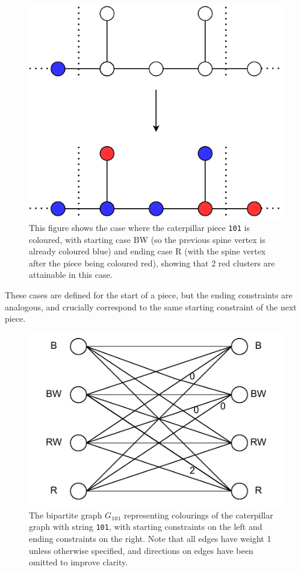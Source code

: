\documentclass{mpaper}
\begin{document}
\begin{figure}
    \centering
    \includegraphics[scale=0.75]{mpaper/figures/CaterpillarPieceColouring.pdf}
    \caption{This figure shows the case where the caterpillar piece \texttt{101} is coloured, with starting case BW (so the previous spine vertex is already coloured blue) and ending case R (with the spine vertex after the piece being coloured red), showing that 2 red clusters are attainable in this case.}
    \label{fig/caterpillar-piece-colouring}
\end{figure}

These cases are defined for the start of a piece, but the ending constraints are analogous, and crucially correspond to the same starting constraint of the next piece.

\begin{figure}
    \centering
    \includegraphics[scale=0.75]{mpaper/figures/ColouringGraph101.pdf}
    \caption{The bipartite graph $G_{\texttt{101}}$ representing colourings of the caterpillar graph with string \texttt{101}, with starting constraints on the left and ending constraints on the right. Note that all edges have weight 1 unless otherwise specified, and directions on edges have been omitted to improve clarity.}
    \label{fig/colouring_101}
\end{figure}
\end{document}
